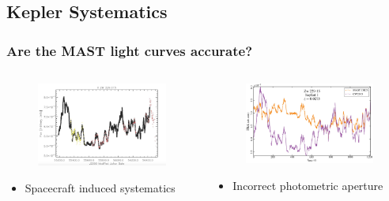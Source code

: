 \documentclass[hyperref={pdfpagelabels=false}]{beamer}
\begin{document}
\subsection{Kepler Systematics}

\begin{frame}
\frametitle{Are the MAST light curves accurate?}
  \begin{columns}
    \begin{column}{0.5\textwidth}
      \begin{figure}
        \includegraphics[scale=0.1525]{images/p2fig1.jpg}
      \end{figure}
      \begin{center}
        {\tiny \citet*{CariniWilliamsAAS}}
      \end{center}
    \begin{itemize}
      \item Spacecraft induced systematics
    \end{itemize}
    \end{column}
    \begin{column}{0.5\textwidth}
      \begin{figure}
        \includegraphics[scale=0.13]{images/p2fig2.jpg}
      \end{figure}
    \begin{itemize}
      \item Incorrect photometric aperture
    \end{itemize}
    \end{column}
  \end{columns}
\end{frame}
\end{document}
